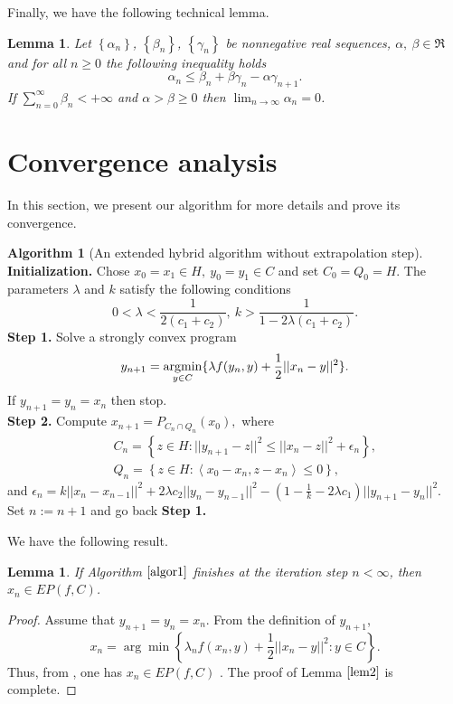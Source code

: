 \documentclass{aims}
\newtheorem{lemma}[theorem]{Lemma}
\theoremstyle{definition}
\newtheorem{algorithm}{Algorithm}
\begin{document}
Finally, we have the following technical lemma.
\begin{lemma}\cite{MS2015}\label{lem.technique}
Let $\left\{\alpha_n\right\}$, $\left\{\beta_n\right\}$, $\left\{\gamma_n\right\}$ be nonnegative real sequences, 
$\alpha,~\beta \in \Re$ and for all $n\ge 0$ the following inequality holds
$$ \alpha_n\le \beta_n+\beta \gamma_n-\alpha \gamma_{n+1}. $$
If $\sum_{n=0}^\infty \beta_n <+\infty$ and $\alpha>\beta\ge 0$ then $\lim_{n\to\infty}\alpha_n=0$.
\end{lemma}
\section{Convergence analysis}\label{main}
\setcounter{theorem}{0}
\setcounter{remark}{0}
\setcounter{corollary}{0}
\setcounter{algorithm}{0}
In this section, we present our algorithm for more details and prove its convergence.
\begin{algorithm}[An extended hybrid algorithm without extrapolation step]\label{algor1}
\noindent \textbf{Initialization.} Chose $x_0=x_1 \in H, ~y_0=y_1\in C$ and set $C_0=Q_0=H$. The parameters $\lambda$ and $k$ satisfy the following 
conditions
$$0< \lambda <\frac{1}{2(c_1+c_2)},~ k>\frac{1}{1-2\lambda(c_1+c_2)}.$$
\textbf{Step 1.} Solve a strongly convex program
$$
y_{n+1}=  \underset{y\in C}{\rm argmin} \{ \lambda f(y_n, y) +\frac{1}{2}||x_n-y||^2\}.
$$
If $y_{n+1}=y_n=x_n$ then stop. \\
\textbf{Step 2.} Compute $x_{n+1}=P_{C_n\cap Q_n}(x_0),$
where 
\begin{eqnarray*}
&&C_n=\left\{z\in H: ||y_{n+1} - z||^2\leq ||x_n-z||^2+\epsilon_n \right\},\\
&&Q_n=\left\{z\in H: \left\langle x_0-x_n,z-x_n\right\rangle\le 0\right\},
\end{eqnarray*}
and $\epsilon_n=k||x_n-x_{n-1}||^2+2\lambda c_2||y_n-y_{n-1}||^2-(1-\frac{1}{k}-2\lambda c_1)||y_{n+1}-y_{n}||^2$. 
Set $n:=n+1$ and go back \textbf{Step 1.}
\end{algorithm}
We have the following result.
\begin{lemma}\label{lem2}
If Algorithm $\ref{algor1}$ finishes at the iteration step $n<\infty$, then $x_n\in EP(f,C)$.
\end{lemma}
\begin{proof}
Assume that $y_{n+1}=y_n=x_n$. From the definition of $y_{n+1}$,
$$ x_n=\arg\min\left\{\lambda_n f(x_n,y)+\frac{1}{2}||x_n-y||^2: y\in C\right\}. $$
Thus, from \cite[Proposition 2.1]{M2000}, one has $x_n\in EP(f,C)$ . The proof of Lemma  $\ref{lem2}$ is complete.
\end{proof}
\end{document}

